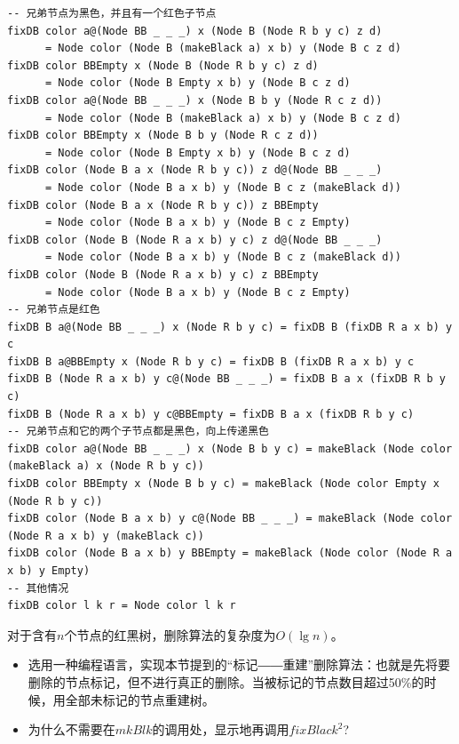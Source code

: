 \documentclass{ctexart}
\begin{document}
\begin{lstlisting}[style=Haskell]
-- 兄弟节点为黑色，并且有一个红色子节点
fixDB color a@(Node BB _ _ _) x (Node B (Node R b y c) z d)
      = Node color (Node B (makeBlack a) x b) y (Node B c z d)
fixDB color BBEmpty x (Node B (Node R b y c) z d)
      = Node color (Node B Empty x b) y (Node B c z d)
fixDB color a@(Node BB _ _ _) x (Node B b y (Node R c z d))
      = Node color (Node B (makeBlack a) x b) y (Node B c z d)
fixDB color BBEmpty x (Node B b y (Node R c z d))
      = Node color (Node B Empty x b) y (Node B c z d)
fixDB color (Node B a x (Node R b y c)) z d@(Node BB _ _ _)
      = Node color (Node B a x b) y (Node B c z (makeBlack d))
fixDB color (Node B a x (Node R b y c)) z BBEmpty
      = Node color (Node B a x b) y (Node B c z Empty)
fixDB color (Node B (Node R a x b) y c) z d@(Node BB _ _ _)
      = Node color (Node B a x b) y (Node B c z (makeBlack d))
fixDB color (Node B (Node R a x b) y c) z BBEmpty
      = Node color (Node B a x b) y (Node B c z Empty)
-- 兄弟节点是红色
fixDB B a@(Node BB _ _ _) x (Node R b y c) = fixDB B (fixDB R a x b) y c
fixDB B a@BBEmpty x (Node R b y c) = fixDB B (fixDB R a x b) y c
fixDB B (Node R a x b) y c@(Node BB _ _ _) = fixDB B a x (fixDB R b y c)
fixDB B (Node R a x b) y c@BBEmpty = fixDB B a x (fixDB R b y c)
-- 兄弟节点和它的两个子节点都是黑色，向上传递黑色
fixDB color a@(Node BB _ _ _) x (Node B b y c) = makeBlack (Node color (makeBlack a) x (Node R b y c))
fixDB color BBEmpty x (Node B b y c) = makeBlack (Node color Empty x (Node R b y c))
fixDB color (Node B a x b) y c@(Node BB _ _ _) = makeBlack (Node color (Node R a x b) y (makeBlack c))
fixDB color (Node B a x b) y BBEmpty = makeBlack (Node color (Node R a x b) y Empty)
-- 其他情况
fixDB color l k r = Node color l k r
\end{lstlisting}

对于含有$n$个节点的红黑树，删除算法的复杂度为$O(\lg n)$。

\begin{Exercise}

\begin{itemize}
\item 选用一种编程语言，实现本节提到的“标记――重建”删除算法：也就是先将要删除的节点标记，但不进行真正的删除。当被标记的节点数目超过50\%的时候，用全部未标记的节点重建树。
\item 为什么不需要在$mkBlk$的调用处，显示地再调用$fixBlack^2$?
\end{itemize}

\end{Exercise}
\end{document}
